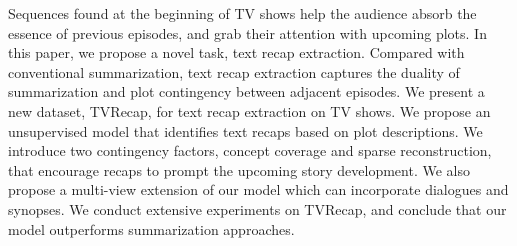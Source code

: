 Sequences found at the beginning of TV shows help the audience absorb the essence of previous episodes, and grab their attention with upcoming plots. In this paper, we propose a novel task, text recap extraction. Compared with conventional summarization, text recap extraction captures the duality of summarization and plot contingency between adjacent episodes. We present a new dataset, TVRecap, for text recap extraction on TV shows. We propose an unsupervised model that identifies text recaps based on plot descriptions. We introduce two contingency factors, concept coverage and sparse reconstruction, that encourage recaps to prompt the upcoming story development. We also propose a multi-view extension of our model which can incorporate dialogues and synopses. We conduct extensive experiments on TVRecap, and conclude that our model outperforms summarization approaches.
